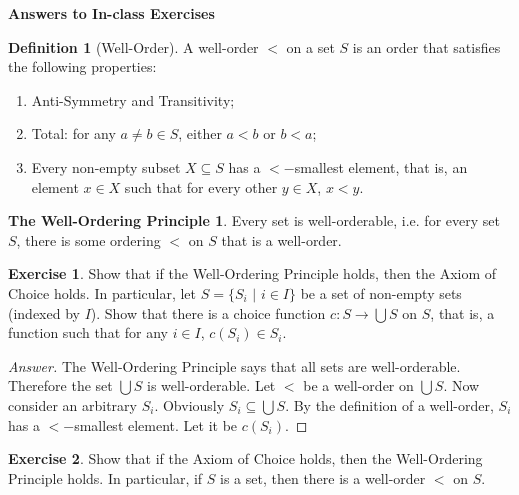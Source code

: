 \documentclass[11pt]{article}
\theoremstyle{definition}
\newtheorem{defn}{Definition}
\newtheorem{exer}{Exercise}
\newtheorem*{wo}{The Well-Ordering Principle}
\begin{document}




\begin{center}
{\LARGE \bf Answers to In-class Exercises}
\end{center}

\smallskip


\begin{defn}[Well-Order]
A well-order $<$ on a set $S$ is an order that satisfies the following properties:
\begin{enumerate}
\item Anti-Symmetry and Transitivity;
\item Total: for any $a \neq b \in S$, either $a < b$ or $b <a$;
\item Every non-empty subset $X \subseteq S$ has a $<-$smallest element, that is, an element $x \in X$ such that for every other $y \in X$, $x <y$.
\end{enumerate}
\end{defn}

\begin{wo}
Every set is well-orderable, i.e. for every set $S$, there is some ordering $<$ on $S$ that is a well-order.
\end{wo}

\begin{exer}
Show that if the Well-Ordering Principle holds, then the Axiom of Choice holds. In particular, let $S = \{S_i \, \, | \, \, i \in I \}$ be a set of non-empty sets (indexed by $I$). Show that there is a choice function $c: S \rightarrow \bigcup S$ on $S$, that is, a function such that for any $i \in I$, $c(S_i) \in S_i$.
\end{exer}

\begin{proof}[Answer]
The Well-Ordering Principle says that all sets are well-orderable. Therefore the set $\bigcup S$ is well-orderable. Let $<$ be a well-order on $\bigcup S$. Now consider an arbitrary $S_i$. Obviously $S_i \subseteq \bigcup S$. By the definition of a  well-order, $S_i$ has a $<-$smallest element. Let it be $c(S_i)$.

\end{proof}

\begin{exer}
Show that if the Axiom of Choice holds, then the Well-Ordering Principle holds. In particular, if $S$ is a set, then there is a well-order $<$ on $S$.
\end{exer}
\end{document}
